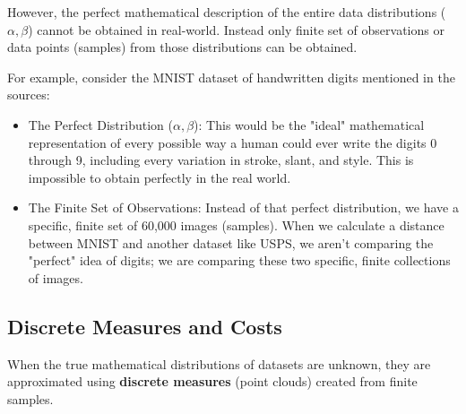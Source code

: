 \documentclass[11pt, a4paper]{article}
\theoremstyle{plain} %
\theoremstyle{definition} %
\begin{document}
			However, the perfect mathematical description of the entire data distributions ($\alpha, \beta$) cannot be obtained in real-world. Instead only finite set of observations or data points (samples) from those distributions can be obtained.

			For example, consider the MNIST dataset of handwritten digits mentioned in the sources:
			\begin{itemize}
				\item The Perfect Distribution ($\alpha, \beta$): This would be the "ideal" mathematical representation of every possible way a human could ever write the digits 0 through 9, including every variation in stroke, slant, and style. This is impossible to obtain perfectly in the real world.
				\item The Finite Set of Observations: Instead of that perfect distribution, we have a specific, finite set of 60,000 images (samples). When we calculate a distance between MNIST and another dataset like USPS, we aren't comparing the "perfect" idea of digits; we are comparing these two specific, finite collections of images.
			\end{itemize}


		\subsection{Discrete Measures and Costs}
		\label{sec:discrete_measures_and_costs}
			When the true mathematical distributions of datasets are unknown, they are approximated using \textbf{discrete measures} (point clouds) created from finite samples.
\end{document}
